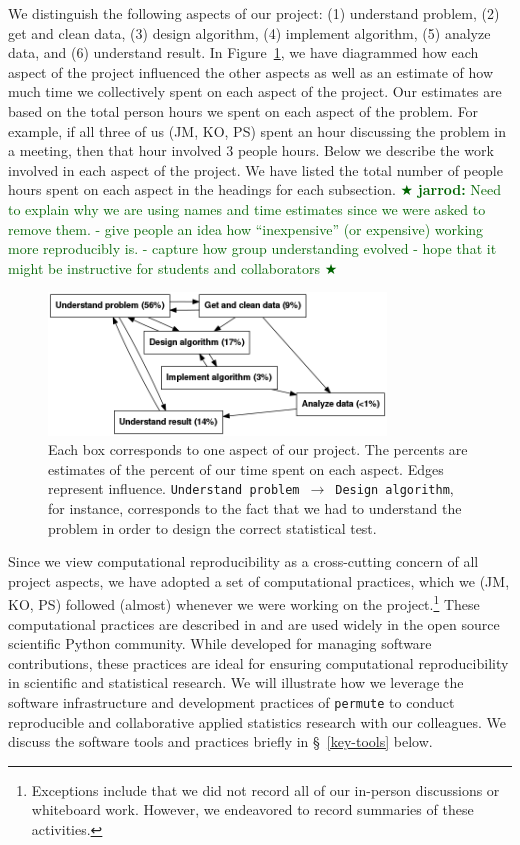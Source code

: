 \documentclass[]{article}
\newcommand{\jarrod}[1] { \textcolor{darkgreen} {
\ensuremath{\bigstar} {\bf jarrod:}  {#1}
\ensuremath{\bigstar} } }
\begin{document}
We distinguish the following aspects of our project:
(1) understand problem,
(2) get and clean data,
(3) design algorithm,
(4) implement algorithm,
(5) analyze data, and
(6) understand result.
In Figure~\ref{fig:work_process}, we have diagrammed how each aspect of the
project influenced the other aspects as well as an estimate of how much time
we collectively spent on each aspect of the project.
Our estimates are based on the total person hours we spent on each aspect of
the problem.
For example, if all three of us (JM, KO, PS) spent an hour discussing the
problem in a meeting, then that hour involved 3 people hours.
Below we describe the work involved in each aspect of the project.
We have listed the total number of people hours spent on each aspect in the
headings for each subsection.
\jarrod{Need to explain why we are using names and time estimates since
we were asked to remove them.
- give people an idea how ``inexpensive'' (or expensive) working more
  reproducibly is.
- capture how group understanding evolved
- hope that it might be instructive for students and collaborators}

\begin{figure}[h]
  \centering
    \includegraphics[width=0.8\textwidth]{_fig/work_process.png}
  \caption{
  \small
    Each box corresponds to one aspect of our project.
    The percents are estimates of the percent of our time spent on each aspect.
    Edges represent influence.
    \texttt{Understand problem}~$\to$~\texttt{Design algorithm}, for instance,
    corresponds to the fact that we had to understand the problem in order to
    design the correct statistical test.\label{fig:work_process}}
\end{figure}

Since we view computational reproducibility as a cross-cutting concern of all
project aspects, we have adopted a set of computational practices, which we
(JM, KO, PS) followed (almost) whenever we were working on the
project.\footnote{Exceptions include that we did not record all of our
in-person discussions or whiteboard work.  However, we endeavored to
record summaries of these activities.}
These computational practices are described in \citet{millman2014developing}
and are used widely in the open source scientific Python community.
While developed for managing software contributions, these practices are ideal
for ensuring computational reproducibility in scientific and statistical
research.
We will illustrate how we leverage the software infrastructure and development
practices of \texttt{permute} to conduct reproducible and collaborative applied
statistics research with our colleagues.
We discuss the software tools and practices briefly in \S~\ref{key-tools} below.
\end{document}
